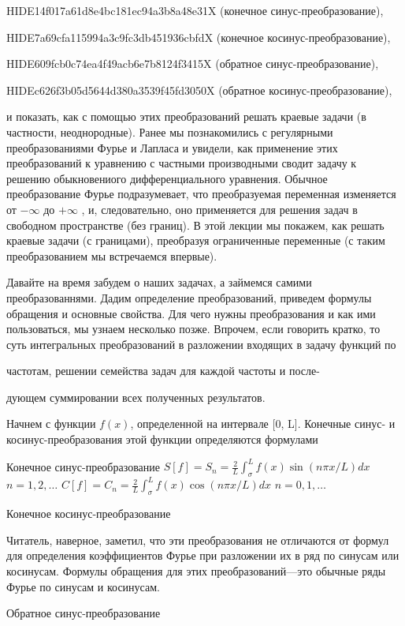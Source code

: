 \documentclass[
  ukrainian,
]{article}
\begin{document}
HIDE14f017a61d8e4bc181ec94a3b8a48e31X (конечное синус-преобразование),

HIDE7a69cfa115994a3c9fc3db451936cbfdX (конечное косинус-преобразование),

HIDE609fcb0c74ea4f49acb6e7b8124f3415X (обратное синус-преобразование),

HIDEc626f3b05d5644d380a3539f45fd3050X (обратное косинус-преобразование),

и показать, как с помощью этих преобразований решать краевые задачи (в
частности, неоднородные). Ранее мы познакомились с регулярными
преобразованиями Фурье и Лапласа и увидели, как применение этих
преобразований к уравнению с частными производными сводит задачу к
решению обыкновениого дифференциального уравнения. Обычное
преобразование Фурье подразумевает, что преобразуемая переменная
изменяется от \(-\infty\) до \(+\infty\) , и, следовательно, оно
применяется для решения задач в свободном пространстве (без границ). В
этой лекции мы покажем, как решать краевые задачи (с границами),
преобразуя ограниченные переменные (с таким преобразованием мы
встречаемся впервые).

Давайте на время забудем о наших задачах, а займемся самими
преобразованнями. Дадим определение преобразований, приведем формулы
обращения и основные свойства. Для чего нужны преобразования и как ими
пользоваться, мы узнаем несколько позже. Впрочем, если говорить кратко,
то суть интегральных преобразований в разложении входящих в задачу
функций по

частотам, решении семейства задач для каждой частоты и после-

дующем суммировании всех полученных результатов.

Начнем с функции \(f(x)\), определенной на интервале {[}0, L{]}.
Конечные синус- и косинус-преобразования этой функции определяются
формулами

Конечное синус-преобразование
\(S[f] = S_n = \frac{2}{L} \int_{\sigma}^{L} f(x) \sin(n\pi x/L) dx\)
\(n = 1, 2, \dots\)
\(C[f] = C_n = \frac{2}{L} \int_{\sigma}^{L} f(x) \cos(n\pi x/L) dx\)
\(n = 0, 1, \dots\)

Конечное косинус-преобразование

Читатель, наверное, заметил, что эти преобразования не отличаются от
формул для определения коэффициентов Фурье при разложении их в ряд по
синусам или косинусам. Формулы обращения для этих преобразований---это
обычные ряды Фурье по синусам и косинусам.

Обратное синус-преобразование
\end{document}
